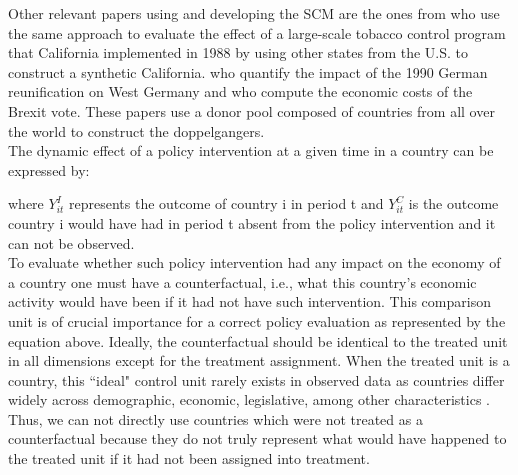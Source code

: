 \documentclass[11pt, a4paper, leqno]{article}
\begin{document}
Other relevant papers using and developing the SCM are the ones from \citet{Abadie2010} who use the same approach to evaluate the effect of a large-scale tobacco control program that California implemented in 1988 by using other states from the U.S. to construct a synthetic California. \citet{Abadie2015} who quantify the impact of the 1990 German reunification on West Germany and \citet{Born2018} who compute the economic costs of the Brexit vote. These papers use a donor pool composed of countries from all over the world to construct the doppelgangers. \\

The dynamic effect of a policy intervention at a given time in a country can be expressed by: 

where $Y_{it}^I$ represents the outcome of country i in period t and $Y_{it}^C$ is the outcome country i would have had in period t absent from the policy intervention and it can not be observed. \\

To evaluate whether such policy intervention had any impact on the economy of a country one must have a counterfactual, i.e., what this country's economic activity would have been if it had not have such intervention. This comparison unit is of crucial importance for a correct policy evaluation as represented by the equation above. Ideally, the counterfactual should be identical to the treated unit in all dimensions except for the treatment assignment. When the treated unit is a country, this ``ideal" control unit rarely exists in observed data as countries differ widely across demographic, economic, legislative, among other characteristics \citet{Born2018}. Thus, we can not directly use countries which were not treated as a counterfactual because they do not truly represent what would have happened to the treated unit if it had not been assigned into treatment. \\
\end{document}
